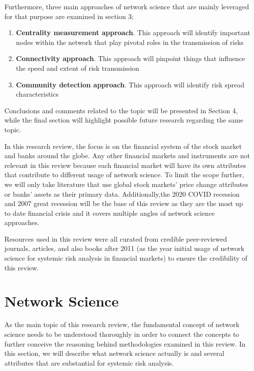 \documentclass[a4paper,11pt]{article}
\begin{document}
Furthermore, three main approaches of network science that are mainly leveraged for that purpose are examined in section 3; 
\begin{enumerate}
        \item \textbf{Centrality measurement approach}. This approach will identify important nodes within the network that play pivotal roles in the transmission of risks
        \item \textbf{Connectivity approach}. This approach will pinpoint things that influence the speed and extent of risk transmission
        \item \textbf{Community detection approach}. This approach will identify risk spread characteristics
\end{enumerate}
Conclusions and comments related to the topic will be presented in Section 4, while the final section will highlight possible future research regarding the same topic.

In this research review, the focus is on the financial system of the stock market and banks around the globe. Any other financial markets and instruments are not relevant in this review because each financial market will have its own attributes that contribute to different usage of network science. To limit the scope further, we will only take literature that use global stock markets’ price change attributes or banks’ assets as their primary data. Additionally,the 2020 COVID recession and 2007 great recession will be the base of this review as they are the most up to date financial crisis and it covers multiple angles of network science approaches.

Resources used in this review were all curated from credible peer-reviewed journals, articles, and also books after 2011 (as the year initial usage of network science for systemic risk analysis in financial markets) to ensure the credibility of this review.

\section{Network Science}
As the main topic of this research review, the fundamental concept of network science needs to be understood thoroughly in order to connect the concepts to further conceive the reasoning behind methodologies examined in this review. In this section, we will describe what network science actually is and several attributes that are substantial for systemic risk analysis.
\end{document}
